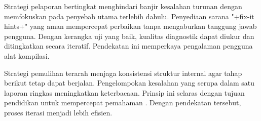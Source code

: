 \documentclass[../main.tex]{subfiles}
\begin{document}
Strategi pelaporan bertingkat menghindari banjir kesalahan turunan dengan memfokuskan pada penyebab utama terlebih dahulu. Penyediaan sarana "+fix-it hints+" yang aman mempercepat perbaikan tanpa mengaburkan tanggung jawab pengguna. Dengan kerangka uji yang baik, kualitas diagnostik dapat diukur dan ditingkatkan secara iteratif. Pendekatan ini memperkaya pengalaman pengguna alat kompilasi.

Strategi pemulihan terarah menjaga konsistensi struktur internal agar tahap berikut tetap dapat berjalan. Pengelompokan kesalahan yang serupa dalam satu laporan ringkas meningkatkan keterbacaan. Prinsip ini selaras dengan tujuan pendidikan untuk mempercepat pemahaman \citep{Mogensen2010}. Dengan pendekatan tersebut, proses iterasi menjadi lebih efisien.
\end{document}
